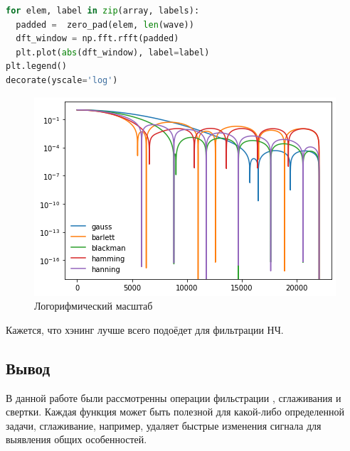 \begin{lstlisting}[language=Python]
for elem, label in zip(array, labels):
  padded =  zero_pad(elem, len(wave))
  dft_window = np.fft.rfft(padded)
  plt.plot(abs(dft_window), label=label)
plt.legend()
decorate(yscale='log')
\end{lstlisting}
\begin{figure}[H]
	\begin{center}
		\includegraphics[scale=1]{fig/lab08/lab08_10.png}
		\caption{Логорифмический масштаб}
	\end{center}
\end{figure}

Кажется, что хэнинг лучше всего подоёдет для фильтрации НЧ.

\subsection{Вывод}

В данной работе были рассмотренны операции фильстрации , сглаживания и свертки. Каждая функция может быть полезной для какой-либо определенной задачи, сглаживание, например, удаляет быстрые изменения сигнала для выявления общих особенностей.
